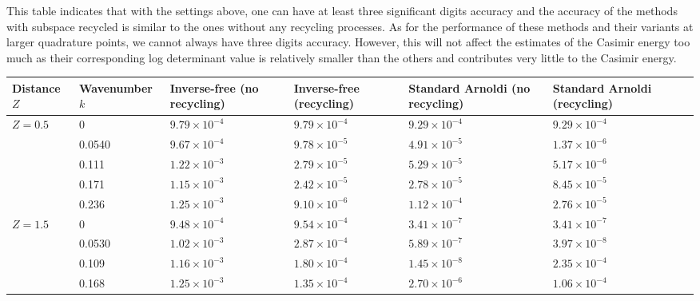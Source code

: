 This table indicates that with the settings above, one can have at least three significant digits accuracy and the accuracy of the methods with subspace 
recycled is similar to the ones without any recycling processes. As for the performance of these methods and their variants at larger quadrature points, we 
cannot always have three digits accuracy. However, this will not affect the estimates of the Casimir energy too 
much as their corresponding log determinant value is relatively smaller than the others and contributes very little to the Casimir energy. 
 
\begin{table}[H]
    \centering
    \begin{tabular}{ |M{1.5cm}|M{2.0cm}|M{2.2cm} |M{2.2cm}|M{3cm}|M{3cm}|M{2.2cm}| } 
    \hline
    Distance $Z$ & Wavenumber $k$ &  Inverse-free (no recycling) & Inverse-free (recycling) & Standard Arnoldi (no recycling) & Standard Arnoldi (recycling)\\
    \hline
       & 0        & $9.79\times 10^{-4}$  & $9.79\times 10^{-4}$  &$9.29\times 10^{-4}$ &$9.29\times 10^{-4}$\\ 
                                   & 0.0540   & $9.67\times 10^{-4}$  & $9.78\times 10^{-5}$  &$4.91\times 10^{-5}$ &$1.37\times 10^{-6}$\\ 
                                   & 0.111    & $1.22\times 10^{-3}$  & $2.79\times 10^{-5}$  &$5.29\times 10^{-5}$ &$5.17\times 10^{-6}$\\ 
                                   & 0.171    & $1.15\times 10^{-3}$  & $2.42\times 10^{-5}$  &$2.78\times 10^{-5}$ &$8.45\times 10^{-5}$\\ 
                                   & 0.236    & $1.25\times 10^{-3}$  & $9.10\times 10^{-6}$  &$1.12\times 10^{-4}$ &$2.76\times 10^{-5}$\\ 
    \hline
    \hline
       & 0        & $9.48\times 10^{-4}$  & $9.54\times 10^{-4}$  &$3.41\times 10^{-7}$ &$3.41\times 10^{-7}$\\ 
                                   & 0.0530   & $1.02\times 10^{-3}$  & $2.87\times 10^{-4}$  &$5.89\times 10^{-7}$ &$3.97\times 10^{-8}$\\ 
                                   & 0.109    & $1.16\times 10^{-3}$  & $1.80\times 10^{-4}$  &$1.45\times 10^{-8}$ &$2.35\times 10^{-4}$\\ 
                                   & 0.168    & $1.25\times 10^{-3}$  & $1.35\times 10^{-4}$  &$2.70\times 10^{-6}$ &$1.06\times 10^{-4}$\\ 

\end{tabular}
\end{table}
